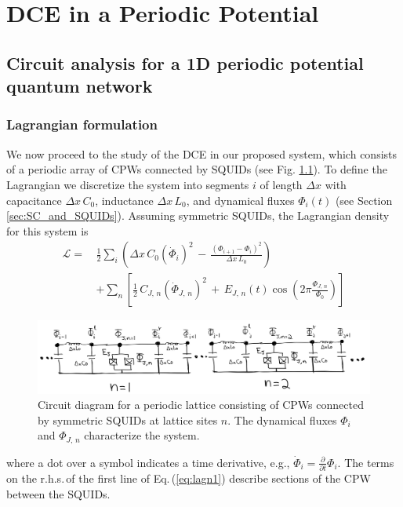  \chapter{DCE in a Periodic Potential} \label{ch:system}


\section{Circuit analysis for a 1D periodic potential quantum network}\label{sec:circ_an}


\subsection{Lagrangian formulation}
\noindent
We now proceed to the study of the DCE in our proposed system, which consists of a periodic array of CPWs connected by SQUIDs (see Fig. \ref{fig:circuit_diagram}). To define the Lagrangian we discretize the system into 
segments $i$ of length $\Delta x$ with capacitance $\Delta x \, C_0$, inductance $\Delta x \, L_0$, and dynamical fluxes $\Phi_i(t)$ 
(see Section \ref{sec:SC_and_SQUIDs}).
Assuming symmetric SQUIDs, the Lagrangian density for this system is 
%
\begin{equation} \label{eq:lagn1}
\begin{split}
\mathcal{L} = \, & \frac{1}{2} \sum_i \left( \Delta x \, C_{0} \left(\dot{\Phi}_{i}\right)^{2} \, - \, 
\frac{\left(\Phi_{i+1}-\Phi_{i}\right)^{2}}{\Delta x \, L_{0}} \right)  \\[2mm]
& + \sum_n \left[ \frac{1}{2} \, C_{J,\,n} \left(\dot{\Phi}_{J,\,n} \right)^{2} \, + \, 
E_{J,\,n}(t) \cos\left(2\pi \frac{\Phi_{J,\,n}}{\Phi_0} \right) \right]
\end{split}
\end{equation}
%
\begin{figure}
    \centering
    \includegraphics[width=\textwidth, keepaspectratio]{figures/system/circuit_diagram.png}
    \caption{Circuit diagram for a periodic lattice consisting of CPWs connected by symmetric SQUIDs at lattice sites $n$. 
    The dynamical fluxes $\Phi_i$ and $\Phi_{J,\,n}$ characterize the system.}
    \label{fig:circuit_diagram}
\end{figure}
%
where a dot over a symbol indicates a time derivative, e.g., 
$\displaystyle \dot{\Phi}_i = \frac{\partial}{\partial t} \Phi_i$.
The terms on the r.h.s.\,of the first line of Eq.\,(\ref{eq:lagn1}) describe sections of the CPW between the SQUIDs. 

